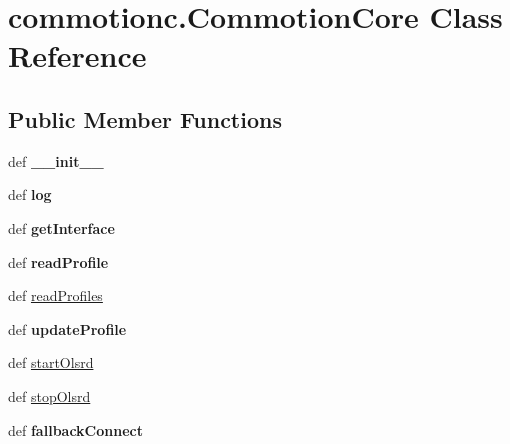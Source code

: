 \hypertarget{classcommotionc_1_1CommotionCore}{\section{commotionc.\+Commotion\+Core Class Reference}
\label{classcommotionc_1_1CommotionCore}
}
\subsection*{Public Member Functions}
\begin{DoxyCompactItemize}
\item 
\hypertarget{classcommotionc_1_1CommotionCore_acbbc49a045330bfff2f45fb873f1a4c1}{def {\bfseries \+\_\+\+\_\+init\+\_\+\+\_\+}}\label{classcommotionc_1_1CommotionCore_acbbc49a045330bfff2f45fb873f1a4c1}

\item 
\hypertarget{classcommotionc_1_1CommotionCore_adc7b8770d8f4a8a63789a96d6283677a}{def {\bfseries log}}\label{classcommotionc_1_1CommotionCore_adc7b8770d8f4a8a63789a96d6283677a}

\item 
\hypertarget{classcommotionc_1_1CommotionCore_a770e8502d6bfa8d55da17cfe55d323ba}{def {\bfseries get\+Interface}}\label{classcommotionc_1_1CommotionCore_a770e8502d6bfa8d55da17cfe55d323ba}

\item 
\hypertarget{classcommotionc_1_1CommotionCore_af1a3f2a15db27db1345473d867d84a95}{def {\bfseries read\+Profile}}\label{classcommotionc_1_1CommotionCore_af1a3f2a15db27db1345473d867d84a95}

\item 
def \hyperlink{classcommotionc_1_1CommotionCore_afeae8d932eda42d5abb9f2460d6639df}{read\+Profiles}
\item 
\hypertarget{classcommotionc_1_1CommotionCore_af2a5a24bba2a3c8ef11171e1d3b75fbd}{def {\bfseries update\+Profile}}\label{classcommotionc_1_1CommotionCore_af2a5a24bba2a3c8ef11171e1d3b75fbd}

\item 
def \hyperlink{classcommotionc_1_1CommotionCore_a902f252959889291da5f06cb591dbd35}{start\+Olsrd}
\item 
def \hyperlink{classcommotionc_1_1CommotionCore_a2cadf11999f9a99eb148957fafe80bbe}{stop\+Olsrd}
\item 
\hypertarget{classcommotionc_1_1CommotionCore_a72a52282c1aada2f4ea171df7f4dec34}{def {\bfseries fallback\+Connect}}\label{classcommotionc_1_1CommotionCore_a72a52282c1aada2f4ea171df7f4dec34}

\end{DoxyCompactItemize}
